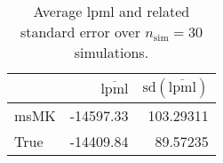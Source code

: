 \begin{table}[H]

\caption{Average lpml and related standard error over $n_{\text{sim}} = 30$ simulations.}
\centering
\begin{tabular}[t]{lrr}
\toprule
  & $\overbar{\text{lpml}}$ & $\text{sd}(\overbar{\text{lpml}})$\\
\midrule
msMK & -14597.33 & 103.29311\\
True & -14409.84 & 89.57235\\
\bottomrule
\end{tabular}
\end{table}